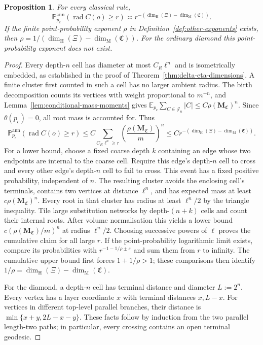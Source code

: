 \documentclass[scheme=plain,11pt]{ctexart}
\newtheorem{proposition}[theorem]{Proposition}
\theoremstyle{definition}
\theoremstyle{remark}
\newcommand{\dimhaus}{\dim_{\mathrm H}}
\newcommand{\dimmass}{\dim_{\mathrm M}}
\begin{document}
\begin{proposition}\label{prop:annealed-radius-tail}
For every classical rule,
\[
 \mathbb P_{p_c}^{\mathrm{ann}}(\operatorname{rad}C(o)\ge r)
 \asymp r^{-(\dimhaus(\Xi)-\dimmass(\mathfrak C))}.
\]
If the finite point-probability exponent $\rho$ in Definition~\ref{def:other-exponents} exists, then
$\rho=1/(\dimhaus(\Xi)-\dimmass(\mathfrak C))$.
For the ordinary diamond this point-probability exponent does not exist.
\end{proposition}
\begin{proof}
Every depth-$n$ cell has diameter at most $C_R\ell^n$ and is isometrically embedded, as established in the proof of Theorem~\ref{thm:delta-eta-dimensions}.
A finite cluster first counted in such a cell has no larger ambient radius.
The birth decomposition counts its vertices with weight proportional to $m^{-n}$, and Lemma~\ref{lem:conditional-mass-moments} gives
$\mathbb E_{p_c}\sum_{C\in\mathcal J_n}|C|\le C\rho(\mathbf M_{\mathfrak C})^n$.
Since $\theta(p_c)=0$, all root mass is accounted for.
Thus
\[
 \mathbb P_{p_c}^{\mathrm{ann}}(\operatorname{rad}C(o)\ge r)
 \le C\sum_{C_R\ell^n\ge r}
 \left(\frac{\rho(\mathbf M_{\mathfrak C})}{m}\right)^n
 \le Cr^{-(\dimhaus(\Xi)-\dimmass(\mathfrak C))}.
\]
For a lower bound, choose a fixed coarse depth $k$ containing an edge whose two endpoints are internal to the coarse cell.
Require this edge's depth-$n$ cell to cross and every other edge's depth-$n$ cell to fail to cross.
This event has a fixed positive probability, independent of $n$.
The resulting cluster avoids the enclosing cell's terminals, contains two vertices at distance $\ell^n$, and has expected mass at least $c\rho(\mathbf M_{\mathfrak C})^n$.
Every root in that cluster has radius at least $\ell^n/2$ by the triangle inequality.
Tile large substitution networks by depth-$(n+k)$ cells and count their internal roots.
After volume normalisation this yields a lower bound $c(\rho(\mathbf M_{\mathfrak C})/m)^n$ at radius $\ell^n/2$.
Choosing successive powers of $\ell$ proves the cumulative claim for all large $r$.
If the point-probability logarithmic limit exists, compare its probabilities with $r^{-1-1/\rho\pm\varepsilon}$ and sum them from $r$ to infinity.
The cumulative upper bound first forces $1+1/\rho>1$; these comparisons then identify $1/\rho=\dimhaus(\Xi)-\dimmass(\mathfrak C)$.

For the diamond, a depth-$n$ cell has terminal distance and diameter $L:=2^n$.
Every vertex has a layer coordinate $x$ with terminal distances $x,L-x$.
For vertices in different top-level parallel branches, their distance is
$\min\{x+y,2L-x-y\}$.
These facts follow by induction from the two parallel length-two paths; in particular, every crossing contains an open terminal geodesic.


\end{proof}
\end{document}
